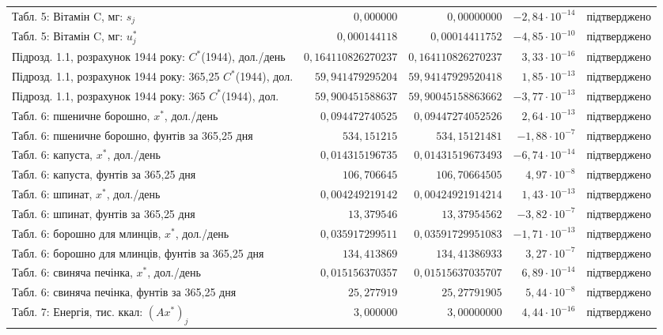 {\begin{longtable}{>{\raggedright}p{4.3cm}rrr>{\raggedright\arraybackslash}p{2.3cm}}
Табл. 5: Вітамін C, мг: $s_j$ & $0{,}000000$ & $0{,}00000000$ & $-2{,}84\cdot10^{-14}$ & підтверджено \\
Табл. 5: Вітамін C, мг: $u_j^*$ & $0{,}000144118$ & $0{,}00014411752$ & $-4{,}85\cdot10^{-10}$ & підтверджено \\
Підрозд. 1.1, розрахунок 1944 року: $C^*$(1944), дол./день & $0{,}164110826270237$ & $0{,}164110826270237$ & $3{,}33\cdot10^{-16}$ & підтверджено \\
Підрозд. 1.1, розрахунок 1944 року: 365{,}25 $C^*$(1944), дол. & $59{,}941479295204$ & $59{,}94147929520418$ & $1{,}85\cdot10^{-13}$ & підтверджено \\
Підрозд. 1.1, розрахунок 1944 року: 365 $C^*$(1944), дол. & $59{,}900451588637$ & $59{,}90045158863662$ & $-3{,}77\cdot10^{-13}$ & підтверджено \\
Табл. 6: пшеничне борошно, $x^*$, дол./день & $0{,}094472740525$ & $0{,}09447274052526$ & $2{,}64\cdot10^{-13}$ & підтверджено \\
Табл. 6: пшеничне борошно, фунтів за 365{,}25 дня & $534{,}151215$ & $534{,}15121481$ & $-1{,}88\cdot10^{-7}$ & підтверджено \\
Табл. 6: капуста, $x^*$, дол./день & $0{,}014315196735$ & $0{,}01431519673493$ & $-6{,}74\cdot10^{-14}$ & підтверджено \\
Табл. 6: капуста, фунтів за 365{,}25 дня & $106{,}706645$ & $106{,}70664505$ & $4{,}97\cdot10^{-8}$ & підтверджено \\
Табл. 6: шпинат, $x^*$, дол./день & $0{,}004249219142$ & $0{,}00424921914214$ & $1{,}43\cdot10^{-13}$ & підтверджено \\
Табл. 6: шпинат, фунтів за 365{,}25 дня & $13{,}379546$ & $13{,}37954562$ & $-3{,}82\cdot10^{-7}$ & підтверджено \\
Табл. 6: борошно для млинців, $x^*$, дол./день & $0{,}035917299511$ & $0{,}03591729951083$ & $-1{,}71\cdot10^{-13}$ & підтверджено \\
Табл. 6: борошно для млинців, фунтів за 365{,}25 дня & $134{,}413869$ & $134{,}41386933$ & $3{,}27\cdot10^{-7}$ & підтверджено \\
Табл. 6: свиняча печінка, $x^*$, дол./день & $0{,}015156370357$ & $0{,}01515637035707$ & $6{,}89\cdot10^{-14}$ & підтверджено \\
Табл. 6: свиняча печінка, фунтів за 365{,}25 дня & $25{,}277919$ & $25{,}27791905$ & $5{,}44\cdot10^{-8}$ & підтверджено \\
Табл. 7: Енергія, тис. ккал: $(Ax^*)_j$ & $3{,}000000$ & $3{,}00000000$ & $4{,}44\cdot10^{-16}$ & підтверджено \\

\end{longtable}}
